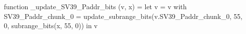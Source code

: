function _update_SV39_Paddr_bits (v, x) = let v = { v with SV39_Paddr_chunk_0 = update_subrange_bits(v.SV39_Paddr_chunk_0, 55, 0, subrange_bits(x, 55, 0)) } in
  v
